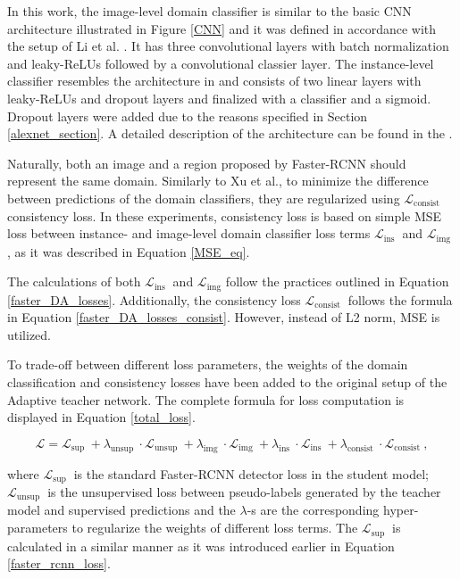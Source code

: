 \documentclass[english, 12pt, a4paper, elec, utf8, a-1b, online]{aaltothesis}
\begin{document}
In this work, the image-level domain classifier is similar to the basic CNN architecture illustrated in Figure \ref{CNN} and it was defined in accordance with the setup of Li et al. \cite{Li2021}. It has three convolutional layers with batch normalization and leaky-ReLUs followed by a convolutional classier layer. The instance-level classifier resembles the architecture in \cite{Xu2020} and consists of two linear layers with leaky-ReLUs and dropout layers and finalized with a classifier and a sigmoid. Dropout layers were added due to the reasons specified in Section \ref{alexnet_section}. A detailed description of the architecture can be found in the . 

Naturally, both an image and a region proposed by Faster-RCNN should represent the same domain. Similarly to Xu et al., to minimize the difference between predictions of the domain classifiers, they are regularized using $\mathcal{L}_{\text {consist }}$ consistency loss. In these experiments, consistency loss is based on simple MSE loss between instance- and image-level domain classifier loss terms $\mathcal{L}_{\text {ins }}$ and $\mathcal{L}_{\text {img }}$, as it was described in Equation \ref{MSE_eq}.

The calculations of both $\mathcal{L}_{\text {ins }}$ and $\mathcal{L}_{\text {img}}$ follow the practices outlined in Equation \ref{faster_DA_losses}. Additionally,  the consistency loss $\mathcal{L}_{\text {consist }}$ follows the formula in Equation \ref{faster_DA_losses_consist}. However, instead of L2 norm, MSE is utilized.  

To trade-off between different loss parameters, the weights of the domain classification and consistency losses have been added to the original setup of the Adaptive teacher network. The complete formula for loss computation is displayed in Equation \ref{total_loss}. 

\begin{equation}
\mathcal{L}=\mathcal{L}_{\text {sup }}+\lambda_{\text {unsup }} \cdot \mathcal{L}_{\text {unsup }}+\lambda_{\text {img }} \cdot \mathcal{L}_{\text {img }}+\lambda_{\text {ins }} \cdot \mathcal{L}_{\text {ins }}+\lambda_{\text {consist }} \cdot \mathcal{L}_{\text {consist }},
\label{total_loss} 
\end{equation}

where $\mathcal{L}_{\text {sup }}$ is the standard Faster-RCNN detector loss in the student model; $\mathcal{L}_{\text {unsup }}$ is the unsupervised loss between pseudo-labels generated by the teacher model and supervised predictions and the $\lambda$-s are the corresponding hyper-parameters to regularize the weights of different loss terms. The $\mathcal{L}_{\text {sup }}$ is calculated in a similar manner as it was introduced earlier in Equation \ref{faster_rcnn_loss}. 
 
\end{document}
